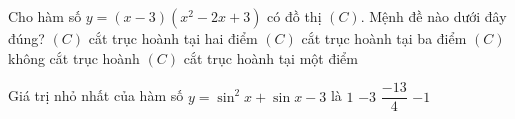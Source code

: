 \begin{ex}%
Cho hàm số $y=\left( {x-3} \right) \left( {x^2-2x+3} \right)$ có đồ thị $\left( {C} \right)$. Mệnh đề nào dưới đây đúng?
\choice
{$\left( {C} \right)$ cắt trục hoành tại hai điểm}
{$\left( {C} \right)$ cắt trục hoành tại ba điểm}
{$\left( {C} \right)$ không cắt trục hoành}
{\True $\left( {C} \right)$ cắt trục hoành tại một điểm}
\end{ex}

\begin{ex}%
Giá trị nhỏ nhất của hàm số $y=\sin ^2x+\sin x-3$ là
\choice
{$1$}
{$-3$}
{\True $\dfrac{-13}{4}$}
{$-1$}
\end{ex}

